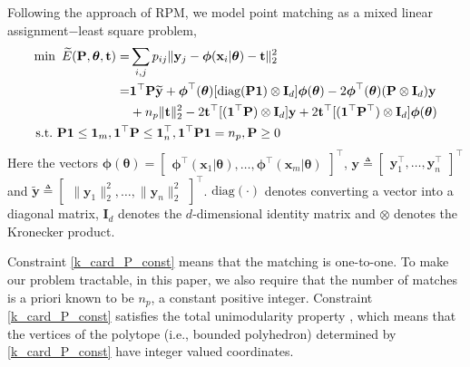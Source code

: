 \documentclass[11pt,bezier,]{article}
\begin{document}
Following the approach of RPM,
we model  point matching as 
a mixed linear assignment$-$least square problem,
\begin{align}
\min\ \widetilde E (\mathbf P,{{\boldsymbol\theta}},{\mathbf t})= &
\sum_{i,j}p_{ij}\| {\mathbf y}_j- \boldsymbol\phi( {\mathbf x}_i | \boldsymbol\theta) - {\mathbf t}\|^2_2  
   \notag \\
=& {\mathbf 1}^\top \mathbf P\mathbf{\widetilde y}  
+ \boldsymbol\phi^\top(\boldsymbol\theta) [\text{diag}(\mathbf P{\mathbf 1})\otimes \mathbf I_d]
\boldsymbol\phi(\boldsymbol\theta)
  - 2 \boldsymbol\phi^\top(\boldsymbol\theta)  (\mathbf P\otimes \mathbf I_d) \mathbf y \notag\\
&  + n_p \|{\mathbf t}\|^2_2
 -2 {\mathbf t}^\top [({\mathbf 1}^\top \mathbf P)\otimes \mathbf I_d] \mathbf y
 +2{\mathbf t}^\top [({\mathbf 1}^\top {\mathbf P}^\top)\otimes \mathbf I_d] \boldsymbol\phi(\boldsymbol\theta)  \label{E_lin_tr} \\
 \text{s.t.} \ \mathbf P  {\mathbf 1}\le  {\mathbf 1}_m, 
 {\mathbf 1}^\top &\mathbf P\le  {\mathbf 1}_n^\top,
 {\mathbf 1}^\top \mathbf P  {\mathbf 1}=n_p,  
\mathbf P\ge 0 
\label{k_card_P_const}
\end{align}
Here the vectors $\boldsymbol\phi(\boldsymbol\theta)=\begin{bmatrix}
                       \boldsymbol\phi^\top(\mathbf x_1|\boldsymbol\theta),\ldots,\boldsymbol\phi^\top(\mathbf x_m|\boldsymbol\theta)
                      \end{bmatrix}^\top$,
$\mathbf y\triangleq\begin{bmatrix}
   \mathbf y_1^\top, \dots, \mathbf y_n^\top
  \end{bmatrix}^\top$
and $\mathbf {\widetilde y}\triangleq \begin{bmatrix}
   \|\mathbf y_1\|_2^2, \dots, \|\mathbf y_n\|_2^2
  \end{bmatrix}^\top$.
 $\text{diag}(\cdot)$ denotes converting a vector into a diagonal matrix,
$\mathbf I_d$ denotes the $d$-dimensional identity matrix and $\otimes$ denotes the Kronecker product.

Constraint \eqref{k_card_P_const} means that the matching
 is  one-to-one.
To make our problem tractable,
in this paper, 
we also require that the  number of matches is a priori known to be  $n_p$, a constant positive integer.
 Constraint  \eqref{k_card_P_const} satisfies 
the total unimodularity property \cite{correspondence_concave,book_comb_optimize}, 
which means that the vertices of the polytope 
(i.e., bounded polyhedron) determined by \eqref{k_card_P_const} have integer valued coordinates. 
\end{document}
